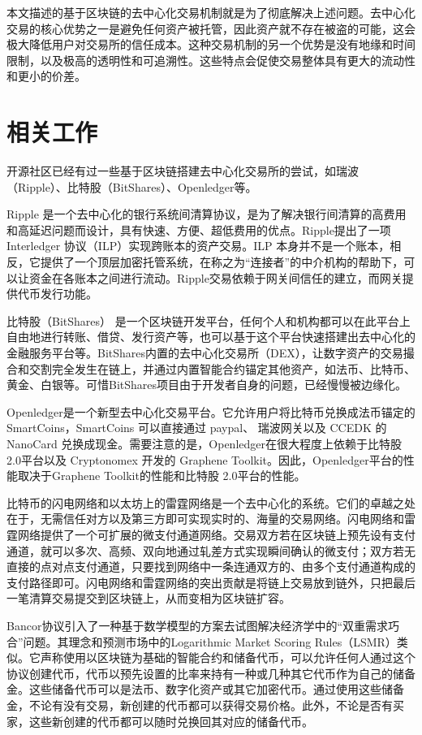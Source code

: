 \documentclass[UTF8,nofonts]{ctexart}
\begin{document}
本文描述的基于区块链的去中心化交易机制就是为了彻底解决上述问题。去中心化交易的核心优势之一是避免任何资产被托管，因此资产就不存在被盗的可能，这会极大降低用户对交易所的信任成本。这种交易机制的另一个优势是没有地缘和时间限制，以及极高的透明性和可追溯性。这些特点会促使交易整体具有更大的流动性和更小的价差。

\section{相关工作\label{sec:existingworks}}

开源社区已经有过一些基于区块链搭建去中心化交易所的尝试，如瑞波（Ripple）、比特股（BitShares）、Openledger等。

Ripple \cite{schwartz2014ripple} 是一个去中心化的银行系统间清算协议，是为了解决银行间清算的高费用和高延迟问题而设计，具有快速、方便、超低费用的优点。Ripple提出了一项Interledger \cite{thomas2015protocol} 协议（ILP）实现跨账本的资产交易。ILP 本身并不是一个账本，相反，它提供了一个顶层加密托管系统，在称之为“连接者”的中介机构的帮助下，可以让资金在各账本之间进行流动。Ripple交易依赖于网关间信任的建立，而网关提供代币发行功能。

比特股（BitShares） \cite{schuhbitshares}\cite{schuh2015bitshares}  是一个区块链开发平台，任何个人和机构都可以在此平台上自由地进行转账、借贷、发行资产等，也可以基于这个平台快速搭建出去中心化的金融服务平台等。BitShares内置的去中心化交易所（DEX），让数字资产的交易撮合和交割完全发生在链上，并通过内置智能合约锚定其他资产，如法币、比特币、黄金、白银等。可惜BitShares项目由于开发者自身的问题，已经慢慢被边缘化。

Openledger是一个新型去中心化交易平台。它允许用户将比特币兑换成法币锚定的 SmartCoins，SmartCoins 可以直接通过 paypal、 瑞波网关以及 CCEDK 的 NanoCard 兑换成现金。需要注意的是，Openledger在很大程度上依赖于比特股 2.0平台以及 Cryptonomex 开发的 Graphene Toolkit。因此，Openledger平台的性能取决于Graphene Toolkit的性能和比特股 2.0平台的性能。

比特币的闪电网络\cite{poon2015bitcoin}和以太坊上的雷霆网络是一个去中心化的系统。它们的卓越之处在于，无需信任对方以及第三方即可实现实时的、海量的交易网络。闪电网络和雷霆网络提供了一个可扩展的微支付通道网络。交易双方若在区块链上预先设有支付通道，就可以多次、高频、双向地通过轧差方式实现瞬间确认的微支付；双方若无直接的点对点支付通道，只要找到网络中一条连通双方的、由多个支付通道构成的支付路径即可。闪电网络和雷霆网络的突出贡献是将链上交易放到链外，只把最后一笔清算交易提交到区块链上，从而变相为区块链扩容。

Bancor协议引入了一种基于数学模型的方案去试图解决经济学中的“双重需求巧合”问题。其理念和预测市场中的Logarithmic Market Scoring Rules（LSMR）类似。它声称使用以区块链为基础的智能合约和储备代币，可以允许任何人通过这个协议创建代币，代币以预先设置的比率来持有一种或几种其它代币作为自己的储备金。这些储备代币可以是法币、数字化资产或其它加密代币。通过使用这些储备金，不论有没有交易，新创建的代币都可以获得交易价格。此外，不论是否有买家，这些新创建的代币都可以随时兑换回其对应的储备代币。
\end{document}
